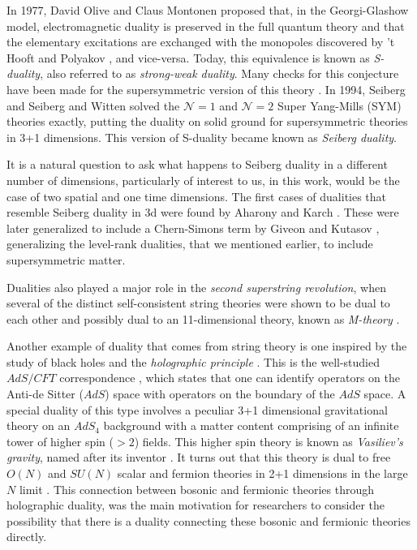 In 1977, David Olive and Claus Montonen \cite{Montonen:1977sn} proposed that, in the Georgi-Glashow model, electromagnetic duality is preserved in the full quantum theory and that the elementary excitations are exchanged with the monopoles discovered by 't Hooft and Polyakov \cite{Polyakov:1974ek, tHooft:1974kcl}, and vice-versa. Today, this equivalence is known as \textit{S-duality}, also referred to as \textit{strong-weak duality}. Many checks for this conjecture have been made for the supersymmetric version of this theory \cite{Osborn:1979tq, Witten:1978mh, Sen:1994yi, Vafa:1994tf}. In 1994, Seiberg \cite{Seiberg:1994bz} and Seiberg and Witten \cite{Seiberg:1994rs} solved the $\mathcal{N}=1$ and $\mathcal{N}=2$ Super Yang-Mills (SYM) theories exactly, putting the duality on solid ground for supersymmetric theories in 3+1 dimensions. This version of S-duality became known as \textit{Seiberg duality}.

It is a natural question to ask what happens to Seiberg duality in a different number of dimensions, particularly of interest to us, in this work, would be the case of two spatial and one time dimensions. The first cases of dualities that resemble Seiberg duality in 3d were found by Aharony and Karch \cite{Aharony:1997gp, Karch:1997ux}. These were later generalized to include a Chern-Simons term by Giveon and Kutasov \cite{Giveon:2008zn}, generalizing the level-rank dualities, that we mentioned earlier, to include supersymmetric matter.

Dualities also played a major role in the \textit{second superstring revolution}, when several of the distinct self-consistent string theories were shown to be dual to each other \cite{Sen:1994fa, Schwarz:1994xn, Sathiapalan:1986zb, Hull:1994ys} and possibly dual to an 11-dimensional theory, known as \textit{M-theory} \cite{Witten:1995ex}.

Another example of duality that comes from string theory is one inspired by the study of black holes and the \textit{holographic principle} \cite{Susskind:1994vu, tHooft:1993dmi}. This is the well-studied $AdS/CFT$ correspondence \cite{Aharony:1999ti, Maldacena:1997re}, which states that one can identify operators on the Anti-de Sitter ($AdS$) space with operators on the boundary of the $AdS$ space. A special duality of this type involves a peculiar 3+1 dimensional gravitational theory on an $AdS_4$ background with a matter content comprising of an infinite tower of higher spin ($>2$) fields. This higher spin theory is known as \textit{Vasiliev's gravity}, named after its inventor \cite{Vasiliev:1992av}. It turns out that this theory is dual to free $O(N)$ and $SU(N)$ scalar and fermion theories in 2+1 dimensions in the large $N$ limit \cite{Sezgin:2003pt, Klebanov:2002ja}. This connection between bosonic and fermionic theories through holographic duality, was the main motivation for researchers to consider the possibility that there is a duality connecting these bosonic and fermionic theories directly. 


